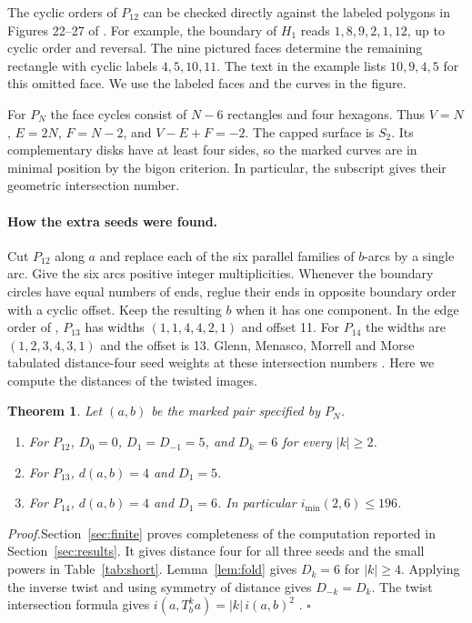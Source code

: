 \documentclass[11pt,a4paper]{article}
\newtheorem{theorem}{Theorem}
\newcommand{\proof}{\par\noindent\textit{Proof.}\enspace}
\newcommand{\qed}{\hfill\(\square\)\par}
\newcommand{\ttcode}[1]{\texttt{\detokenize{#1}}}
\begin{document}
The cyclic orders of \(P_{12}\) can be checked directly against the labeled
polygons in Figures 22--27 of \cite{M}. For example, the boundary of
\(H_1\) reads \(1,8,9,2,1,12\), up to cyclic order and reversal. The
nine pictured faces determine the remaining rectangle with cyclic labels
\(4,5,10,11\). The text in the example lists \(10,9,4,5\) for
this omitted face. We use the labeled faces and the curves in the figure.

For \(P_N\) the face cycles consist of \(N-6\) rectangles and four
hexagons. Thus \(V=N\), \(E=2N\), \(F=N-2\), and \(V-E+F=-2\).
The capped surface is \(S_2\). Its complementary disks have at least
four sides, so the marked curves are in minimal position by the bigon
criterion. In particular, the subscript gives their geometric intersection
number.

\paragraph{How the extra seeds were found.}
Cut \(P_{12}\) along \(a\) and replace each of the six parallel families
of \(b\)-arcs by a single arc. Give the six arcs positive integer
multiplicities. Whenever the boundary circles have equal numbers of
ends, reglue their ends in opposite boundary order with a cyclic offset.
Keep the resulting \(b\) when it has one component. In the edge order
of \ttcode{generate_seeds.py}, \(P_{13}\) has widths \((1,1,4,4,2,1)\)
and offset 11. For \(P_{14}\) the widths are \((1,2,3,4,3,1)\) and the
offset is 13. Glenn, Menasco, Morrell and Morse tabulated distance-four
seed weights at these intersection numbers \cite[\S6]{GMMM}. Here we
compute the distances of the twisted images.

\begin{theorem}\label{thm:main}
Let \((a,b)\) be the marked pair specified by \(P_N\).
\begin{enumerate}
\item For \(P_{12}\), \(D_0=0\), \(D_1=D_{-1}=5\), and
\(D_k=6\) for every \(|k|\ge2\).
\item For \(P_{13}\), \(d(a,b)=4\) and \(D_1=5\).
\item For \(P_{14}\), \(d(a,b)=4\) and \(D_1=6\). In particular
\(i_{\min}(2,6)\le196\).
\end{enumerate}
\end{theorem}

\proof Section~\ref{sec:finite} proves completeness of the computation
reported in Section~\ref{sec:results}. It gives distance four for all
three seeds and the small powers in Table~\ref{tab:short}.
Lemma~\ref{lem:fold} gives \(D_k=6\) for \(|k|\ge4\).
Applying the inverse twist and using symmetry of distance gives
\(D_{-k}=D_k\). The twist intersection formula gives
\(i(a,T_b^k a)=|k|\,i(a,b)^2\) \cite[\S4]{AT}. \qed
\end{document}
